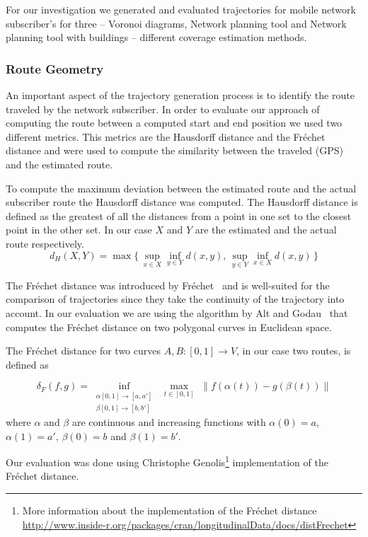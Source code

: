 \documentclass[twocolumn]{bmcart}%
\begin{document}
For our investigation we generated and evaluated trajectories for mobile network subscriber's for three -- Voronoi diagrams, Network planning tool and Network planning tool with buildings -- different coverage estimation methods.
\subsubsection*{Route Geometry}
An important aspect of the trajectory generation process is to identify the route traveled by the network subscriber. In order to evaluate our approach of computing the route between a computed start and end position we used two different metrics. This metrics are the Hausdorff distance and the Fr\'{e}chet distance and were used to compute the similarity between the traveled (GPS) and the estimated route. 

To compute the maximum deviation between the estimated route and the actual subscriber route the Hausdorff distance was computed. The Hausdorff distance is defined as the greatest of all the distances from a point in one set to the closest point in the other set. In our case $X$ and $Y$ are the estimated and the actual route respectively.
\[ d_{H}(X,Y) = \max\{\,\sup_{x \in X} \inf_{y \in Y} d(x,y),\, \sup_{y \in Y} \inf_{x \in X} d(x,y)\,\}\]

The Fr\'{e}chet distance was introduced by Fr\'{e}chet~\cite{Frechet} and is well-suited for the comparison of trajectories since they take the continuity of the trajectory into account. In our evaluation we are using the algorithm by Alt and Godau~\cite{Alt1995} that computes the Fr\'{e}chet distance on two polygonal curves in Euclidean space.

The Fr\'{e}chet distance for two curves $A,B:[0,1]\rightarrow V$, in our case two routes, is defined as 


\[\delta_F(f,g)=\inf_{\substack{\alpha [0,1] \rightarrow [a,a'] \\\beta [0,1] \rightarrow [b,b']} }\,\, \max_{t \in [0,1]} \,\, \lVert f(\alpha(t))-g(\beta(t)) \rVert\]
where $\alpha$ and $\beta$ are continuous and increasing functions with $\alpha(0)=a$, $\alpha(1)=a'$, $\beta(0)=b$ and $\beta(1)=b'$. 

Our evaluation was done using Christophe Genolis\footnote{More information about the implementation of the Fr\'{e}chet distance \url{http://www.inside-r.org/packages/cran/longitudinalData/docs/distFrechet}} implementation of the Fr\'{e}chet distance.
\end{document}
